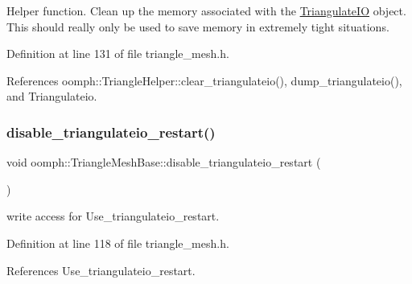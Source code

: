 Helper function. Clean up the memory associated with the \hyperlink{structoomph_1_1TriangulateIO}{Triangulate\+IO} object. This should really only be used to save memory in extremely tight situations. 



Definition at line 131 of file triangle\+\_\+mesh.\+h.



References oomph\+::\+Triangle\+Helper\+::clear\+\_\+triangulateio(), dump\+\_\+triangulateio(), and Triangulateio.

\mbox{\label{classoomph_1_1TriangleMeshBase_a8f34ac9d3a8b7ee39a1134eadc47ff23}} 
\subsubsection{\texorpdfstring{disable\+\_\+triangulateio\+\_\+restart()}{disable\_triangulateio\_restart()}}
{\footnotesize\ttfamily void oomph\+::\+Triangle\+Mesh\+Base\+::disable\+\_\+triangulateio\+\_\+restart (\begin{DoxyParamCaption}{ }\end{DoxyParamCaption})\hspace{0.3cm}{\ttfamily [inline]}}



write access for Use\+\_\+triangulateio\+\_\+restart. 



Definition at line 118 of file triangle\+\_\+mesh.\+h.



References Use\+\_\+triangulateio\+\_\+restart.

\mbox{\label{classoomph_1_1TriangleMeshBase_ad8e275d5f2528d9958964438086be8f4}} 

